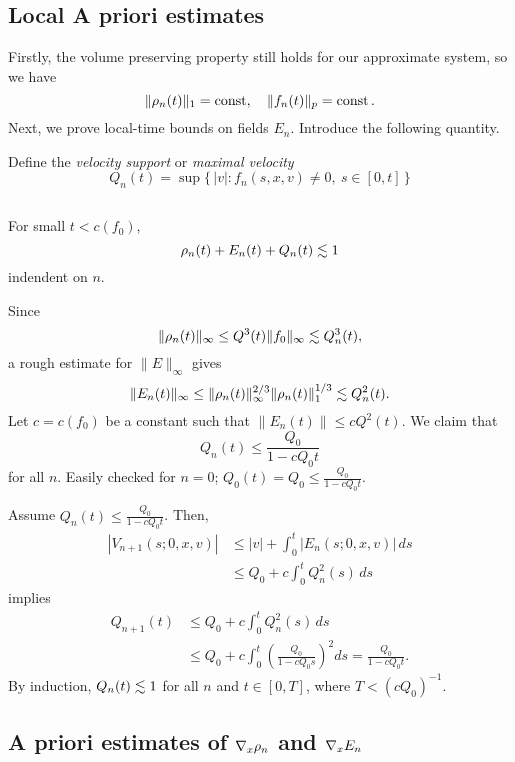 \documentclass[11pt]{amsart}
\begin{document}
\subsection{Local A priori estimates}

Firstly, the volume preserving property still holds for our approximate system, so we have
\[\|\rho_n(t)\|_1=\operatorname{const},\quad\|f_n(t)\|_p=\operatorname{const}.\]
Next, we prove local-time bounds on fields $E_n$.
Introduce the following quantity.
\begin{defn}
Define the \emph{velocity support} or \emph{maximal velocity}
\[Q_n(t)=\sup\{\,|v|:f_n(s,x,v)\ne0,\ s\in[0,t]\,\}\]
\end{defn}

\begin{lem}$ $\\[-12pt]
\begin{cond}
\item
For small $t<c(f_0)$,
\[\rho_n(t)+E_n(t)+Q_n(t)\lesssim1\]
indendent on $n$.
\end{cond}
\end{lem}
\begin{pfs}
\item
Since
\[\|\rho_n(t)\|_\infty\le Q^3(t)\|f_0\|_\infty\lesssim Q_n^3(t),\]
a rough estimate for $\|E\|_\infty$ gives
\[\|E_n(t)\|_\infty\le\|\rho_n(t)\|_\infty^{2/3}\|\rho_n(t)\|_1^{1/3}\lesssim Q_n^2(t).\]
Let $c=c(f_0)$ be a constant such that $\|E_n(t)\|\le cQ^2(t)$.
We claim that
\[Q_n(t)\le\frac{Q_0}{1-cQ_0t}\]
for all $n$.
Easily checked for $n=0$; $Q_0(t)=Q_0\le\frac{Q_0}{1-cQ_0t}$.

Assume $Q_n(t)\le\frac{Q_0}{1-cQ_0t}$.
Then,
\begin{align*}
|V_{n+1}(s;0,x,v)|
&\le|v|+\int_0^t|E_n(s;0,x,v)|\,ds\\
&\le Q_0+c\int_0^tQ_n^2(s)\,ds
\end{align*}
implies
\begin{align*}
Q_{n+1}(t)
&\le Q_0+c\int_0^tQ_n^2(s)\,ds\\
&\le Q_0+c\int_0^t\left(\frac{Q_0}{1-cQ_0s}\right)^2ds
=\frac{Q_0}{1-cQ_0t}.
\end{align*}
By induction, $Q_n(t)\lesssim1$ for all $n$ and $t\in[0,T]$, where $T<(cQ_0)^{-1}$.\qedhere
\end{pfs}

\subsection{A priori estimates of $\nabla_x\rho_n$ and $\nabla_xE_n$}
\end{document}
